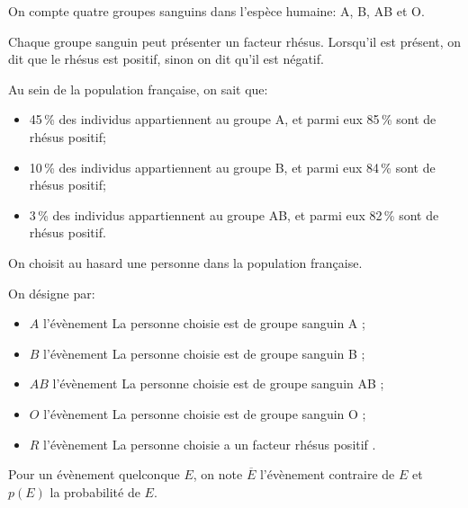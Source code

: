 \medskip

On compte quatre groupes sanguins dans l'espèce humaine: A, B, AB et O.

Chaque groupe sanguin peut présenter un facteur rhésus. Lorsqu'il est présent, on dit que le rhésus est positif, sinon on dit qu'il est négatif.

Au sein de la population française, on sait que:


\begin{itemize}[label=$\bullet~$]
\item 45\,\% des individus appartiennent au groupe A, et parmi eux 85\,\% sont de rhésus positif;
\item 10\,\% des individus appartiennent au groupe B, et parmi eux 84\,\% sont de rhésus positif;
\item 3\,\% des individus appartiennent au groupe AB, et parmi eux 82\,\% sont de rhésus positif.
\end{itemize}
\smallskip

On choisit au hasard une personne dans la population française. 

On désigne par:

\begin{itemize}[label=$\bullet~$]
\item $A$ l'évènement \og La personne choisie est de groupe sanguin A \fg{} ;
\item $B$ l'évènement \og La personne choisie est de groupe sanguin B \fg ;
\item $AB$ l'évènement \og La personne choisie est de groupe sanguin AB \fg ; 
\item $O$ l'évènement \og La personne choisie est de groupe sanguin O \fg ;
\item $R$ l'évènement \og La personne choisie a un facteur rhésus positif \fg.
\end{itemize}

\medskip

Pour un évènement quelconque $E$, on note $\overline{E}$ l'évènement contraire de $E$ et $p(E)$ la probabilité de $E$.

\medskip

